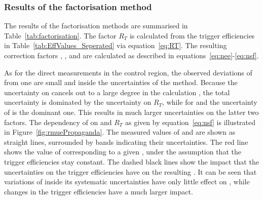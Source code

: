 \subsubsection{Results of the factorisation method}
The results of the factorisation methods are summarised in Table~\ref{tab:factorisation}. The factor $R_T$ is calculated from the trigger efficiencies in Table~\ref{tab:EffValues_Seperated} via equation~\ref{eq:RT}. The resulting correction factors \Rsfof, \Reeof, and \Rmmof are calculated as described in equations~\ref{eq:nee}-\ref{eq:nsf}.  

As for the direct measurements in the control region, the observed deviations of \Rsfof from one are small and inside the uncertainties of the method. Because the uncertainty on \rmue cancels out to a large degree in the calculation \Rsfof, the total uncertainty is dominated by the uncertainty on $R_T$, while for \Reeof and \Rmmof the uncertainty of \rmue is the dominant one. This results in much larger uncertainties on the latter two factors. The dependency of \Rsfof on \rmue and $R_T$ as given by equation~\ref{eq:nsf} is illustrated in Figure~\ref{fig:rmuePropaganda}. The measured values of \rmue and \Rsfof are shown as straight lines, surrounded by bands indicating their uncertainties. The red line shows the value of \Rsfof corresponding to a given \rmue, under the assumption that the trigger efficiencies stay constant. The dashed black lines show the impact that the uncertainties on the trigger efficiencies have on the resulting \Rsfof. It can be seen that variations of \rmue inside its systematic uncertainties have only little effect on \Rsfof, while changes in the trigger efficiencies have a much larger impact. 


